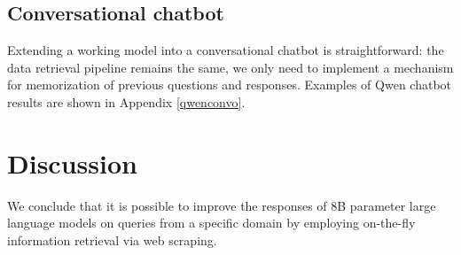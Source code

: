 \documentclass[fleqn,moreauthors,10pt]{ds_report}
\begin{document}
\begin{table}[!htb]
{}
\caption{Performance comparison as evaluated by GPT-mini-4.1 model with DeepEval framework.}
\label{tab:gpt}
\end{table}


\subsection*{Conversational chatbot}

Extending a working model into a conversational chatbot is straightforward: the data retrieval pipeline remains the same, we only need to implement a mechanism for memorization of previous questions and responses. Examples of Qwen chatbot results are shown in Appendix \ref{qwenconvo}.



\section*{Discussion}

We conclude that it is possible to improve the responses of 8B parameter large language models on queries from a specific domain by employing on-the-fly information retrieval via web scraping.  





\end{document}
